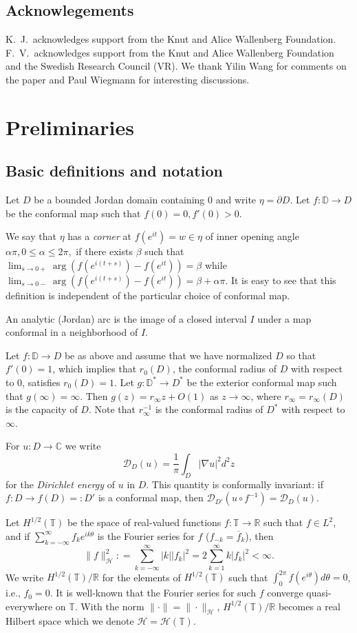 \documentclass{article}
\numberwithin{equation}{section}
\numberwithin{figure}{section}
\theoremstyle{plain}
\theoremstyle{plain}
\numberwithin{thm}{section}
\theoremstyle{remark}
\newcommand{\T}{\mathbb{T}}
\newcommand{\D}{\mathbb{D}}
\let \le \leqslant
\begin{document}
\subsection*{Acknowlegements}K.\ J.\ acknowledges support from the Knut and Alice Wallenberg Foundation. F.\ V.\ acknowledges support from the Knut and Alice Wallenberg Foundation and the Swedish Research Council (VR). We thank Yilin Wang for comments on the paper and Paul Wiegmann for interesting discussions.
\section{Preliminaries}\label{sect:prel}
\subsection{Basic definitions and notation}
Let $D$ be a bounded Jordan domain containing $0$ and write $\eta = \partial D$. Let $f: \D \to D$ be the conformal map such that $f(0)=0, f'(0)>0$. 

We say that $\eta$ has a \emph{corner} at $f(e^{it})=w \in \eta$ of inner opening angle $\alpha \pi,  0 \le \alpha \le 2\pi,$ if there exists $\beta$ such that $\lim_{s \to 0+} \arg(f(e^{i(t+s)}) - f(e^{it})) = \beta$ while $\lim_{s \to 0-} \arg(f(e^{i(t+s)}) - f(e^{it})) = \beta + \alpha \pi$. It is easy to see that this definition is independent of the particular choice of conformal map. 

An analytic (Jordan) arc is the image of a closed interval $I$ under a map conformal in a neighborhood of $I$.


Let $f: \D \to D$ be as above and assume that we have normalized $D$ so that $f'(0)=1$, which implies that $r_0(D)$, the conformal radius of $D$ with respect to $0$, satisfies $r_0(D) = 1$. Let $g : \D^* \to D^*$ be the exterior conformal map such that $g(\infty) = \infty$. Then $g(z) = r_\infty z + O(1)$ as $z \to \infty$, where $r_\infty=r_\infty(D)$ is the capacity of $D$. Note that $r_\infty^{-1}$ is the conformal radius of $D^*$ with respect to $\infty$. 


For $u : D \to \mathbb{C}$ we write
\[
\mathcal{D}_D(u) = \frac{1}{\pi}\int_D |\nabla u|^2 d^2z
\]
for the \emph{Dirichlet energy} of $u$ in $D$. This quantity is conformally invariant: if $f:D \to f(D)=:D'$ is a conformal map, then $\mathcal{D}_{D'}(u \circ f^{-1}) =\mathcal{D}_{D}(u)$.


Let $H^{1/2}(\T)$ be the space of real-valued functions $f:\T \to \mathbb{R}$ such that $f \in L^2$, and if $\sum_{k=-\infty}^\infty f_k e^{ik\theta}$ is the Fourier series for $f$ ($f_{-k} = \overline{f}_k$), then
\[
 \|f\|_{\mathscr{H}}^2 : = \sum_{k=-\infty}^\infty |k||f_k|^2  = 2\sum_{k=1}^\infty k|f_k|^2 < \infty.
\]
We write $H^{1/2}(\T)/\mathbb{R}$ for the elements of $H^{1/2}(\T)$ such that $\int_0^{2\pi} f(e^{i\theta}) d\theta = 0$, i.e., $f_0 =0$.
It is well-known that the Fourier series for such $f$ converge quasi-everywhere on $\T$. With the norm $\|\cdot\| = \|\cdot\|_{\mathscr{H}}$,  $H^{1/2}(\T)/\mathbb{R}$ becomes a real Hilbert space which we denote $\mathscr{H}=\mathscr{H}(\T)$.
\end{document}
